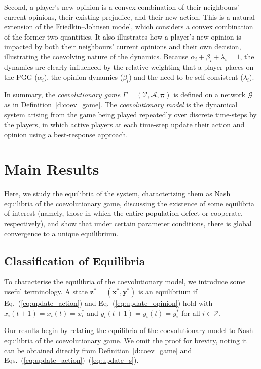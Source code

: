 \documentclass[letterpaper, 10 pt, conference]{ieeeconf}  %
\newcommand{\vect}[1]{\boldsymbol{#1}}
\renewcommand{\eqref}[1]{Eq.~(\ref{#1})}  %
\begin{document}
Second, a player's new opinion is a convex combination of their neighbours' current opinions, their existing prejudice, and their new action. This is a natural extension of the Friedkin--Johnsen model, which considers a convex combination of the former two quantities. It also illustrates how a player's new opinion is impacted by both their neighbours' current opinions and their own decision, illustrating the coevolving nature of the dynamics. Because $\alpha_i+\beta_i+\lambda_i = 1$, the dynamics are clearly influenced by the relative weighting that a player places on the PGG ($\alpha_i$), the opinion dynamics ($\beta_i$) and the need to be self-consistent ($\lambda_i$).

In summary, the \textit{coevolutionary game} $\Gamma=(\mathcal{V}, \mathcal{A}, \vect{\pi})$ is defined on a network $\mathcal{G}$ as in Definition~\ref{d:coev_game}. The \textit{coevolutionary model} is the dynamical system arising from the game being played repeatedly over discrete time-steps by the players, in which active players at each time-step update their action and opinion using a best-response approach. 

\section{Main Results}\label{sec:results}
Here, we study the equilibria of the system, characterizing them as Nash equilibria of the coevolutionary game, discussing the existence of some equilibria of interest (namely, those in which the entire population defect or cooperate, respectively), and show that under certain parameter conditions, there is global convergence to a unique equilibrium.

\subsection{Classification of Equilibria}
To characterise the equilibria of the coevolutionary model, we introduce some useful terminology. A state $\vect z^* = (\vect x^*, \vect y^*)$ is an equilibrium if \eqref{eq:update_action} and \eqref{eq:update_opinion} hold with $x_i(t+1) = x_i(t) = x_i^*$ and $y_i(t+1)=y_i(t)=y_i^*$ for all $i\in\mathcal V$.

Our results begin by relating the equilibria of the coevolutionary model to Nash equilibria of the coevolutionary game. We omit the proof for brevity, noting it can be obtained directly from Definition~\ref{d:coev_game} and Eqs.~(\ref{eq:update_action})--(\ref{eq:update_s}).
\end{document}
